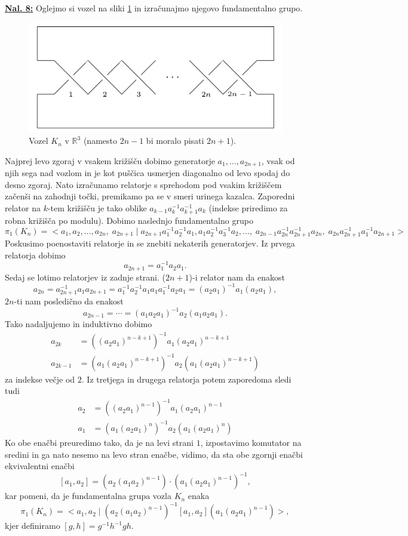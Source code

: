 \documentclass[a4paper, 12pt]{article}
\newcommand{\R}{\mathbb{R}}
\begin{document}
\underline{\textbf{Nal. 8:}}
Oglejmo si vozel na sliki \ref{fig:vozel} in izračunajmo njegovo fundamentalno grupo.
\begin{figure}[h]
	\centering
	\includegraphics[scale=0.4]{knot8.png}
	\caption{Vozel $K_n$ v $\R^3$ (namesto $2n-1$ bi moralo pisati $2n+1$).}
	\label{fig:vozel}
\end{figure}

Najprej levo zgoraj v vsakem križišču dobimo generatorje $a_1,\dots, a_{2n+1}$, vsak od njih sega nad vozlom in je kot puščica usmerjen diagonalno od levo spodaj do desno zgoraj. Nato izračunamo relatorje s sprehodom pod vsakim križiščem začenši na zahodnji točki, premikamo pa se v smeri urinega kazalca. Zaporedni relator na $k$-tem križišču je tako oblike $a_{k-1}a_{k}^{-1}a_{k+1}^{-1}a_{k}$ (indekse priredimo za robna križišča po modulu). Dobimo naslednjo fundamentalno grupo
\[
\pi_1(K_n) = < a_1, a_2, \dots, a_{2n},\; a_{2n+1} \; | \; a_{2n+1}a_1^{-1}a_2^{-1}a_1, a_1a_2^{-1}a_3^{-1}a_2, \dots, \; a_{2n-1}a_{2n}^{-1}a_{2n+1}^{-1}a_{2n},\; a_{2n}a_{2n+1}^{-1}a_{1}^{-1}a_{2n+1}  >
\]
Poskusimo poenostaviti relatorje in se znebiti nekaterih generatorjev. Iz prvega relatorja dobimo
\[
a_{2n+1} = a_1^{-1}a_2a_1.
\]
Sedaj se lotimo relatorjev iz zadnje strani. ($2n+1$)-i relator nam da enakost
\[
a_{2n} = a_{2n+1}^{-1}a_1a_{2n+1} = a_1^{-1}a_2^{-1}a_1a_1a_1^{-1}a_2a_1 = (a_2a_1)^{-1}a_1(a_2a_1),
\]
$2n$-ti nam posledično da enakost
\[
a_{2n-1} = \cdots = (a_1a_2a_1)^{-1}a_2(a_1a_2a_1).
\]
Tako nadaljujemo in induktivno dobimo
\begin{align*}
	a_{2k} &= ((a_2a_1)^{n-k+1})^{-1}a_1(a_2a_1)^{n-k+1} \\
	a_{2k-1} &= (a_1(a_2a_1)^{n-k+1})^{-1}a_2(a_1(a_2a_1)^{n-k+1})
\end{align*}
za indekse večje od $2$.
Iz tretjega in drugega relatorja potem zaporedoma sledi tudi
\begin{align*}
a_{2} &= ((a_2a_1)^{n-1})^{-1}a_1(a_2a_1)^{n-1} \\
a_{1} &= (a_1(a_2a_1)^{n})^{-1}a_2(a_1(a_2a_1)^{n})
\end{align*}
Ko obe enačbi preuredimo tako, da je na levi strani $1$, izpostavimo komutator na sredini in ga nato nesemo na levo stran enačbe, vidimo, da sta obe zgornji enačbi ekvivalentni enačbi
\[
[a_1, a_2] = (a_2(a_1a_2)^{n-1})\cdot(a_1(a_2a_1)^{n-1})^{-1},
\]
kar pomeni, da je fundamentalna grupa vozla $K_n$ enaka
\[
\pi_1(K_n) = < a_1, a_2 \; | \; (a_2(a_1a_2)^{n-1})^{-1}[a_1, a_2](a_1(a_2a_1)^{n-1}) >,
\]
kjer definiramo $[g, h] = g^{-1}h^{-1}gh$.
\end{document}
